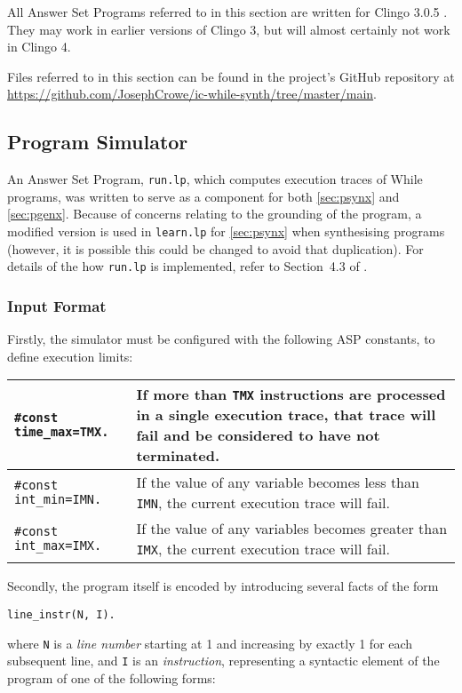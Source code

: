 \documentclass[a4paper,twoside,notitlepage,12pt]{article}
\begin{document}
All Answer Set Programs referred to in this section are written for Clingo 3.0.5 
\cite{clingo3}. They may work in earlier versions of Clingo 3, but will almost
certainly not work in Clingo 4.

Files referred to in this section can be found in the project's GitHub repository at \\
\url{https://github.com/JosephCrowe/ic-while-synth/tree/master/main}.

\subsection{Program Simulator}

An Answer Set Program, \verb|run.lp|, which computes execution traces of While 
programs, was written to serve as a component for both \ref{sec:psynx} and 
\ref{sec:pgenx}. Because of concerns relating to the grounding of the program, a 
modified version is used in \verb|learn.lp| for \ref{sec:psynx} when synthesising 
programs (however, it is possible this could be changed to avoid that duplication). For 
details of the how \verb|run.lp| is implemented, refer to Section~4.3 of \cite{final}.

\subsubsection{Input Format}

Firstly, the simulator must be configured with the following ASP constants, to define 
execution limits:

\begin{tabularx}{\textwidth}{|l|X|}
\hline
\verb|#const time_max=TMX.| &
If more than \verb|TMX| instructions are processed in a single execution trace, that 
trace will fail and be considered to have not terminated. \\*
\hline
\verb|#const int_min=IMN.| &
If the value of any variable becomes less than \verb|IMN|, the current execution trace 
will fail. \\*
\hline
\verb|#const int_max=IMX.| &
If the value of any variables becomes greater than \verb|IMX|, the current execution 
trace will fail. \\*
\hline
\end{tabularx}

Secondly, the program itself is encoded by introducing several facts of the form
\begin{verbatim}
line_instr(N, I).
\end{verbatim}
where \verb|N| is a \emph{line number} starting at 1 and increasing by exactly 1 for
each subsequent line, and \verb|I| is an \emph{instruction}, representing a syntactic
element of the program of one of the following forms:
\end{document}
